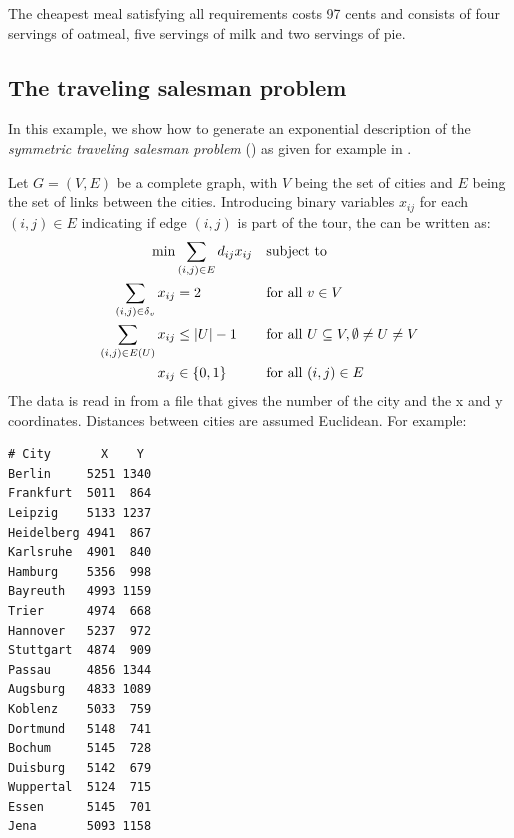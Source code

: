 \medskip
\noindent The cheapest meal satisfying all requirements costs 97 cents and
consists of four servings of oatmeal, five servings of milk and two
servings of pie.


\subsection{The traveling salesman problem}
In this example, we show how to generate an exponential
description of the \emph{symmetric traveling salesman problem} (\tsp)
as given for example in
\cite[Section 58.5]{Schrijver2003}.

Let $G=(V,E)$ be a complete graph, with $V$ being the set of cities
and $E$ being the set of links between the cities. Introducing binary
variables $x_{ij}$ for each $(i,j)\in E$ indicating if edge $(i,j)$ is
part of the tour, the \tsp can be written as:
\begin{align*}
\min &\sum_{(i,j)\in E}d_{ij} x_{ij}&&\text{subject to}\nonumber\\
\sum_{(i,j)\in\delta_v} x_{ij}&=2&&\text{for all } v\in V\nonumber\\
\sum_{(i,j)\in E(U)} x_{ij}&\leq |U|-1&&\text{for all } U\subseteq V, \emptyset\neq
U\neq V\\
x_{ij}&\in\{0,1\}&&\text{for all } (i,j)\in E\nonumber
\end{align*}
%
The data is read in from a file that gives the number of the city and the
x and y coordinates. Distances between cities are assumed Euclidean. For example:
{\footnotesize
\setlength\columnseprule{0.4pt}
\begin{multicols}{2}
\begin{verbatim}
# City       X    Y
Berlin     5251 1340
Frankfurt  5011  864
Leipzig    5133 1237
Heidelberg 4941  867
Karlsruhe  4901  840
Hamburg    5356  998
Bayreuth   4993 1159
Trier      4974  668
Hannover   5237  972
Stuttgart  4874  909
Passau     4856 1344
Augsburg   4833 1089
Koblenz    5033  759
Dortmund   5148  741
Bochum     5145  728
Duisburg   5142  679
Wuppertal  5124  715
Essen      5145  701
Jena       5093 1158
\end{verbatim}
\end{multicols}
}


